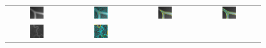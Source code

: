 \begin{figure}[t]
\begin{tabular}{@{}cccc@{}}
\\
\includegraphics[width=0.24\textwidth]{images/L2S_compare/orig_1}	&
\includegraphics[width=0.24\textwidth]{images/L2S_compare/GAC_1}	&
\includegraphics[width=0.24\textwidth]{images/L2S_compare/CV_1}		&
\includegraphics[width=0.24\textwidth]{images/L2S_compare/L2S_1}	
\\
\includegraphics[width=0.24\textwidth]{images/L2S_compare/orig_4}	&
\includegraphics[width=0.24\textwidth]{images/L2S_compare/GAC_4}	&

\end{tabular}
\end{figure}
